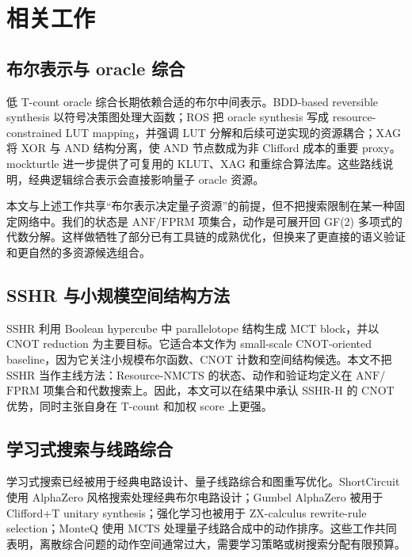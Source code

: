 \documentclass[UTF8,fontset=macnew,11pt]{ctexart}
\newcommand{\method}{Resource-NMCTS}
\newcommand{\anf}{\ensuremath{\mathrm{ANF}}}
\newcommand{\fprm}{\ensuremath{\mathrm{FPRM}}}
\newcommand{\mcts}{\ensuremath{\mathrm{MCTS}}}
\begin{document}
\section{相关工作}

\subsection{布尔表示与 oracle 综合}

低 T-count oracle 综合长期依赖合适的布尔中间表示。BDD-based reversible synthesis 以符号决策图处理大函数\cite{wille2009bdd}；ROS 把 oracle synthesis 写成 resource-constrained LUT mapping，并强调 LUT 分解和后续可逆实现的资源耦合\cite{meuli2020ros}；XAG 将 XOR 与 AND 结构分离，使 AND 节点数成为非 Clifford 成本的重要 proxy\cite{meuli2022xag}。mockturtle 进一步提供了可复用的 KLUT、XAG 和重综合算法库\cite{mockturtle}。这些路线说明，经典逻辑综合表示会直接影响量子 oracle 资源。

本文与上述工作共享“布尔表示决定量子资源”的前提，但不把搜索限制在某一种固定网络中。我们的状态是 \anf{}/\fprm{} 项集合，动作是可展开回 GF(2) 多项式的代数分解。这样做牺牲了部分已有工具链的成熟优化，但换来了更直接的语义验证和更自然的多资源候选组合。

\subsection{SSHR 与小规模空间结构方法}

SSHR 利用 Boolean hypercube 中 parallelotope 结构生成 MCT block，并以 CNOT reduction 为主要目标\cite{zheng2025sshr}。它适合本文作为 small-scale CNOT-oriented baseline，因为它关注小规模布尔函数、CNOT 计数和空间结构候选。本文不把 SSHR 当作主线方法：\method{} 的状态、动作和验证均定义在 \anf{}/\fprm{} 项集合和代数搜索上。因此，本文可以在结果中承认 SSHR-H 的 CNOT 优势，同时主张自身在 T-count 和加权 score 上更强。

\subsection{学习式搜索与线路综合}

学习式搜索已经被用于经典电路设计、量子线路综合和图重写优化。ShortCircuit 使用 AlphaZero 风格搜索处理经典布尔电路设计\cite{tsaras2024shortcircuit}；Gumbel AlphaZero 被用于 Clifford+T unitary synthesis\cite{rietsch2024unitary}；强化学习也被用于 ZX-calculus rewrite-rule selection\cite{riu2025rlzx}；MonteQ 使用 \mcts{} 处理量子线路合成中的动作排序\cite{machiya2026monteq}。这些工作共同表明，离散综合问题的动作空间通常过大，需要学习策略或树搜索分配有限预算。
\end{document}
